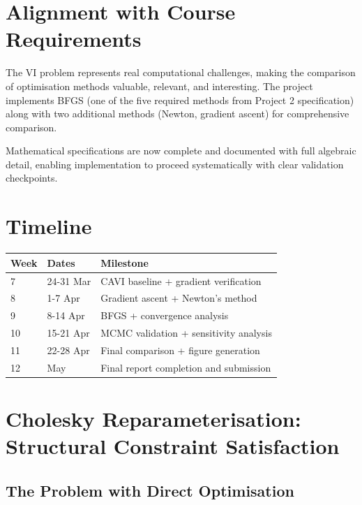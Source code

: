 \documentclass[11pt]{article}
\begin{document}
\section*{Alignment with Course Requirements}

The VI problem represents real computational challenges, making the comparison of optimisation methods valuable, relevant, and interesting. The project implements BFGS (one of the five required methods from Project 2 specification) along with two additional methods (Newton, gradient ascent) for comprehensive comparison.

Mathematical specifications are now complete and documented with full algebraic detail, enabling implementation to proceed systematically with clear validation checkpoints.

\section*{Timeline}

\begin{center}
\begin{tabular}{|l|l|p{7cm}|}
\hline
\textbf{Week} & \textbf{Dates} & \textbf{Milestone} \\
\hline
7 & 24-31 Mar & CAVI baseline + gradient verification \\
8 & 1-7 Apr & Gradient ascent + Newton's method \\
9 & 8-14 Apr & BFGS + convergence analysis \\
10 & 15-21 Apr & MCMC validation + sensitivity analysis \\
11 & 22-28 Apr & Final comparison + figure generation \\
12 & May & Final report completion and submission \\
\hline
\end{tabular}
\end{center}

\newpage
\setcounter{secnumdepth}{1}
\appendix

\section{Cholesky Reparameterisation: Structural Constraint Satisfaction}

\subsection*{The Problem with Direct Optimisation}
\end{document}
